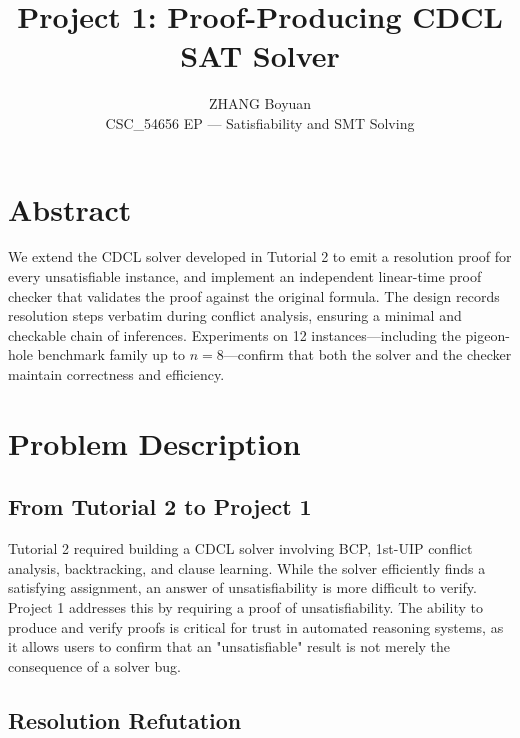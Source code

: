 \documentclass{article}
\begin{document}
\title{Project 1: Proof-Producing CDCL SAT Solver}
\author{ZHANG Boyuan\\
  \small CSC\_54656 EP --- Satisfiability and SMT Solving
}
\date{}
\maketitle

\section*{Abstract}
We extend the CDCL solver developed in Tutorial 2 to emit a
resolution proof for every unsatisfiable instance, and implement
an independent linear-time proof checker that validates the proof
against the original formula.
The design records resolution steps verbatim during conflict analysis,
ensuring a minimal and checkable chain of inferences.
Experiments on 12 instances---including the pigeon-hole benchmark
family up to $n=8$---confirm that both the solver and the checker
maintain correctness and efficiency.

\section{Problem Description}

\subsection{From Tutorial 2 to Project 1}

Tutorial 2 required building a CDCL solver involving BCP, 1st-UIP
conflict analysis, backtracking, and clause learning.
While the solver efficiently finds a satisfying assignment, an
answer of unsatisfiability is more difficult to verify.
Project 1 addresses this by requiring a proof of unsatisfiability.
The ability to produce and verify proofs is critical for trust in
automated reasoning systems, as it allows users to confirm that an
"unsatisfiable" result is not merely the consequence of a solver bug.

\subsection{Resolution Refutation}
\end{document}
